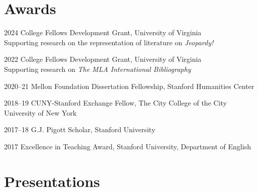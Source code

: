 \documentclass[12pt,letterpaper]{report}
\begin{document}
\section*{Awards}

\begin{tablist}
	\item[2024] \tab{}College Fellows Development Grant, University of Virginia \\
	Supporting research on the representation of literature on \textit{Jeopardy!}
	\item[2022] \tab{}College Fellows Development Grant, University of Virginia \\
	Supporting research on \textit{The MLA International Bibliography}
	\item[2020--21] \tab{}Mellon Foundation Dissertation Fellowship, Stanford Humanities Center
	\item[2018--19] \tab{}CUNY-Stanford Exchange Fellow, The City College of the City University of New York
	\item[2017--18] \tab{}G.J. Pigott Scholar, Stanford University
	\item[2017] \tab{}Excellence in Teaching Award, Stanford University, Department of English
\end{tablist}


\section*{Presentations}
\end{document}
